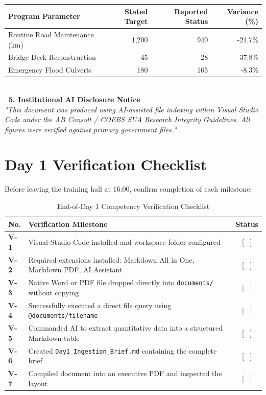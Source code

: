 \documentclass[11pt, a4paper]{report}
\begin{document}
\begin{tcolorbox}[colback=lightgrey, colframe=bordergrey, title=\textbf{Deliverable 1 Preview: \texttt{Day1\_Ingestion\_Brief.md}}]
\begin{tabular}{lrrr}
\toprule
\textbf{Program Parameter} & \textbf{Stated Target} & \textbf{Reported Status} & \textbf{Variance (\%)} \\
\midrule
Routine Road Maintenance (km) & 1,200 & 940 & -21.7\% \\
Bridge Deck Reconstruction & 45 & 28 & -37.8\% \\
Emergency Flood Culverts & 180 & 165 & -8.3\% \\
\bottomrule
\end{tabular}\\[0.2cm]
\textcolor{tanzaniablue}{\textbf{\ 5. Institutional AI Disclosure Notice}}\\
\textit{"This document was produced using AI-assisted file indexing within Visual Studio Code under the AB Consult / COEBS SUA Research Integrity Guidelines. All figures were verified against primary government files."}
\end{tcolorbox}

\section{Day 1 Verification Checklist}
Before leaving the training hall at 16:00, confirm completion of each milestone:

\begin{table}[htbp]
\centering
\caption{End-of-Day 1 Competency Verification Checklist}
\vspace{0.2cm}
\begin{tabular}{@{}>{\bfseries}p{1.2cm}p{10cm}c@{}}
\toprule
No. & Verification Milestone & Status \\
\midrule
V-1 & Visual Studio Code installed and workspace folder configured & [ \ ] \\
V-2 & Required extensions installed: Markdown All in One, Markdown PDF, AI Assistant & [ \ ] \\
V-3 & Native Word or PDF file dropped directly into \texttt{documents/} without copying & [ \ ] \\
V-4 & Successfully executed a direct file query using \texttt{@documents/filename} & [ \ ] \\
V-5 & Commanded AI to extract quantitative data into a structured Markdown table & [ \ ] \\
V-6 & Created \texttt{Day1\_Ingestion\_Brief.md} containing the complete brief & [ \ ] \\
V-7 & Compiled document into an executive PDF and inspected the layout & [ \ ] \\
\bottomrule
\end{tabular}
\end{table}
\end{document}
